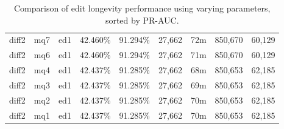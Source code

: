 \begin{sidewaystable}[!ph]
\begin{center}
\begin{tabular}{|c|c|c||c|c||c|c|c|c|}
diff2 & mq7 & ed1 & 42.460\% & 91.294\% & 27,662 & 72m & 850,670 & 60,129 \\
diff2 & mq6 & ed1 & 42.460\% & 91.294\% & 27,662 & 71m & 850,670 & 60,129 \\
diff2 & mq4 & ed1 & 42.437\% & 91.285\% & 27,662 & 68m & 850,653 & 62,185 \\
diff2 & mq3 & ed1 & 42.437\% & 91.285\% & 27,662 & 69m & 850,653 & 62,185 \\
diff2 & mq2 & ed1 & 42.437\% & 91.285\% & 27,662 & 70m & 850,653 & 62,185 \\
diff2 & mq1 & ed1 & 42.437\% & 91.285\% & 27,662 & 70m & 850,653 & 62,185 \\
\hline
\end{tabular}
\end{center}
\caption{Comparison of edit longevity performance using
    varying parameters, sorted by PR-AUC.}
\label{tab:editshoutD}
\end{sidewaystable}
\clearpage

